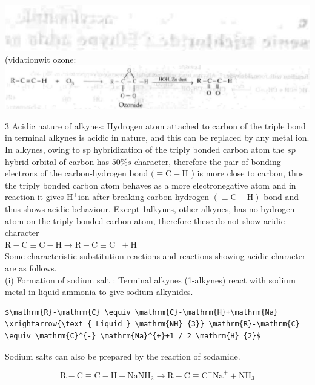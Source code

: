 \documentclass[10pt]{article}
\begin{document}
\includegraphics[max width=\textwidth, center]{2025_01_28_8470952b98110cec3aabg-192(4)}\\
(vidationwit ozone:\\
\includegraphics[max width=\textwidth, center]{2025_01_28_8470952b98110cec3aabg-192(10)}

3 Acidic nature of alkynes: Hydrogen atom attached to carbon of the triple bond in terminal alkynes is acidic in nature, and this can be replaced by any metal ion. In alkynes, owing to sp hybridization of the triply bonded carbon atom the $s p$ hybrid orbital of carbon has $50 \% s$ character, therefore the pair of bonding electrons of the carbon-hydrogen bond $(\equiv \mathrm{C}-\mathrm{H}$ ) is more close to carbon, thus the triply bonded carbon atom behaves as a more electronegative atom and in reaction it gives $\mathrm{H}^{+}$ion after breaking carbon-hydrogen $(\equiv \mathrm{C}-\mathrm{H})$ bond and thus shows acidic behaviour. Except 1alkynes, other alkynes, has no hydrogen atom on the triply bonded carbon atom, therefore these do not show acidic character\\
$\mathrm{R}-\mathrm{C} \equiv \mathrm{C}-\mathrm{H} \rightarrow \mathrm{R}-\mathrm{C} \equiv \mathrm{C}^{-}+\mathrm{H}^{+}$\\
Some characteristic substitution reactions and reactions showing acidic character are as follows.\\
(i) Formation of sodium salt : Terminal alkynes (1-alkynes) react with sodium metal in liquid ammonia to give sodium alkynides.

\begin{verbatim}
$\mathrm{R}-\mathrm{C} \equiv \mathrm{C}-\mathrm{H}+\mathrm{Na} \xrightarrow{\text { Liquid } \mathrm{NH}_{3}} \mathrm{R}-\mathrm{C} \equiv \mathrm{C}^{-} \mathrm{Na}^{+}+1 / 2 \mathrm{H}_{2}$
\end{verbatim}

Sodium salts can also be prepared by the reaction of sodamide.

$$
\mathrm{R}-\mathrm{C} \equiv \mathrm{C}-\mathrm{H}+\mathrm{NaNH}_{2} \longrightarrow \mathrm{R}-\mathrm{C} \equiv \mathrm{C}^{-} \mathrm{Na}^{+}+\mathrm{NH}_{3}
$$
\end{document}
